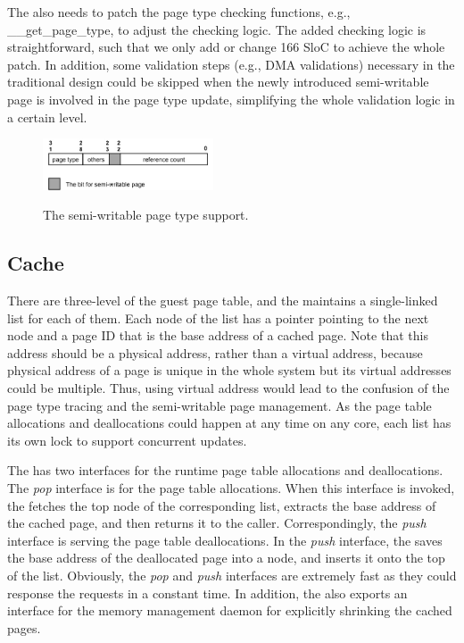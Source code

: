 The \module also needs to patch the page type checking functions, e.g., \_\_get\_page\_type, to adjust the checking logic.
The added checking logic is straightforward, such that we only add or change 166 SloC to achieve the whole patch.
In addition, some validation steps (e.g., DMA validations) necessary in the traditional design could be skipped when the newly introduced semi-writable page is involved in the page type update, simplifying the whole validation logic in a certain level.

\begin{figure}[ht]
\centering
\includegraphics[width=0.45\textwidth]{image/implementation/field-of-semi-type.jpg} \\
\caption{The semi-writable page type support.}
\label{fig:field-of-semi-type}
\end{figure}

\subsection{\name Cache}
There are three-level of the guest page table, and the \cache maintains a single-linked list for each of them.
Each node of the list has a pointer pointing to the next node and a page ID that is the base address of a cached page.
Note that this address should be a physical address, rather than a virtual address, because physical address of a page is unique in the whole system but its virtual addresses could be multiple.
Thus, using virtual address would lead to the confusion of the page type tracing and the semi-writable page management.
As the page table allocations and deallocations could happen at any time on any core, each list has its own lock to support concurrent updates.

The \cache has two interfaces for the runtime page table allocations and deallocations.
The \emph{pop} interface is for the page table allocations.
When this interface is invoked, the \cache fetches the top node of the corresponding list, extracts the base address of the cached page, and then returns it to the caller.
Correspondingly, the \emph{push} interface is serving the page table deallocations.
In the \emph{push} interface, the \cache saves the base address of the deallocated page into a node, and inserts it onto the top of the list.
Obviously, the \emph{pop} and \emph{push} interfaces are extremely fast as they could response the requests in a constant time.
In addition, the \cache also exports an interface for the memory management daemon for explicitly shrinking the cached pages.

